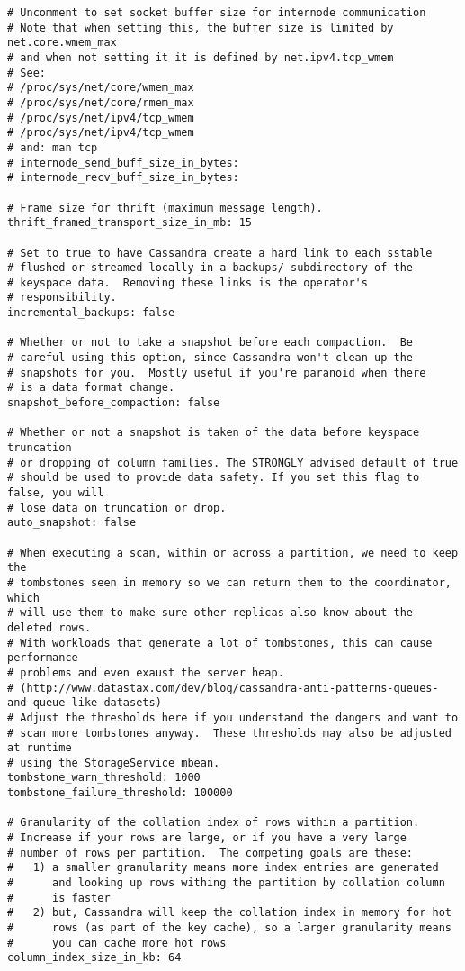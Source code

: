 \begin{verbatim}
# Uncomment to set socket buffer size for internode communication
# Note that when setting this, the buffer size is limited by net.core.wmem_max
# and when not setting it it is defined by net.ipv4.tcp_wmem
# See:
# /proc/sys/net/core/wmem_max
# /proc/sys/net/core/rmem_max
# /proc/sys/net/ipv4/tcp_wmem
# /proc/sys/net/ipv4/tcp_wmem
# and: man tcp
# internode_send_buff_size_in_bytes:
# internode_recv_buff_size_in_bytes:

# Frame size for thrift (maximum message length).
thrift_framed_transport_size_in_mb: 15

# Set to true to have Cassandra create a hard link to each sstable
# flushed or streamed locally in a backups/ subdirectory of the
# keyspace data.  Removing these links is the operator's
# responsibility.
incremental_backups: false

# Whether or not to take a snapshot before each compaction.  Be
# careful using this option, since Cassandra won't clean up the
# snapshots for you.  Mostly useful if you're paranoid when there
# is a data format change.
snapshot_before_compaction: false

# Whether or not a snapshot is taken of the data before keyspace truncation
# or dropping of column families. The STRONGLY advised default of true 
# should be used to provide data safety. If you set this flag to false, you will
# lose data on truncation or drop.
auto_snapshot: false

# When executing a scan, within or across a partition, we need to keep the
# tombstones seen in memory so we can return them to the coordinator, which
# will use them to make sure other replicas also know about the deleted rows.
# With workloads that generate a lot of tombstones, this can cause performance
# problems and even exaust the server heap.
# (http://www.datastax.com/dev/blog/cassandra-anti-patterns-queues-and-queue-like-datasets)
# Adjust the thresholds here if you understand the dangers and want to
# scan more tombstones anyway.  These thresholds may also be adjusted at runtime
# using the StorageService mbean.
tombstone_warn_threshold: 1000
tombstone_failure_threshold: 100000

# Granularity of the collation index of rows within a partition.
# Increase if your rows are large, or if you have a very large
# number of rows per partition.  The competing goals are these:
#   1) a smaller granularity means more index entries are generated
#      and looking up rows withing the partition by collation column
#      is faster
#   2) but, Cassandra will keep the collation index in memory for hot
#      rows (as part of the key cache), so a larger granularity means
#      you can cache more hot rows
column_index_size_in_kb: 64



\end{verbatim}
